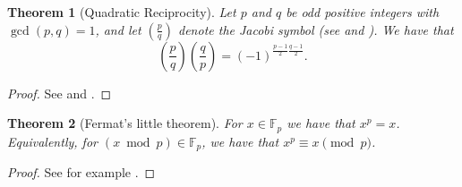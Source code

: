 \documentclass[openany, a4paper, 10pt]{book}
\theoremstyle{plain}
\newtheorem{theorem}{Theorem}[chapter]
\theoremstyle{plain}
\theoremstyle{plain}
\theoremstyle{definition}
\theoremstyle{plain}
\theoremstyle{definition}
\theoremstyle{remark}
\begin{document}
\begin{theorem}[Quadratic Reciprocity]\label{quad_rep}
    Let $p$ and $q$ be odd positive integers with $\gcd(p, q)=1$, and let $\left(\frac{p}{q}\right)$ denote the Jacobi symbol (see \cite[Definition~1.3]{quadrat_recip} and \cite[p.~1]{quadrat_recip2}). We have that
    \begin{equation*}
        \left(\frac{p}{q}\right) \left(\frac{q}{p}\right) = (-1)^{\frac{p-1}{2}\frac{q-1}{2}}.
    \end{equation*}
\end{theorem}
\begin{proof}
    See \cite[pp.~5-6]{quadrat_recip2} and \cite[Section~2]{quadrat_recip}.
\end{proof}

\begin{theorem}[Fermat's little theorem]\label{fermat}
    For $x \in \mathbb F_p$ we have that $x^p = x$.
    Equivalently, for $(x \bmod p) \in \mathbb F_p$, we have that $x^p \equiv x \pmod p$.
\end{theorem}
\begin{proof}
    See for example \cite{fermat_proof}.
\end{proof}
\end{document}
